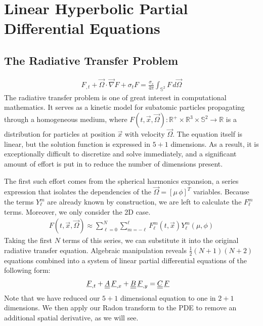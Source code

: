 
\section{Linear Hyperbolic Partial Differential Equations}

\subsection{The Radiative Transfer Problem}
\begin{align*}
	F_{,t} + \vec{\Omega} \cdot \vec{\nabla}F + \sigma_t F = \frac{\sigma_s}{4\pi}\int_{\mathbb{S}^2}F\, d\vec{\Omega}
\end{align*}
The radiative transfer problem is one of great interest in computational mathematics.
It serves as a kinetic model for subatomic particles propagating through a homogeneous medium, where $F(t, \vec{x}, \vec{\Omega}): \mathbb{R}^+ \times \mathbb{R}^3 \times \mathbb{S}^2 \to \mathbb{R}$ is a distribution for particles at position $\vec{x}$ with velocity $\vec{\Omega}$. The equation itself is linear, but the solution function is expressed in $5 + 1$ dimensions.
As a result, it is exceptionally difficult to discretize and solve immediately, and a significant amount of effort is put in to reduce the number of dimensions present.

The first such effort comes from the spherical harmonics expansion, a series expression that isolates the dependencies of the $\vec{\Omega} = [\mu \, \phi]^T$ variables. 
Because the terms $Y_\ell^m$ are already known by construction, we are left to calculate the $F_\ell^m$ terms.
Moreover, we only consider the 2D case.
\begin{align*}
	F(t, \vec{x}, \vec{\Omega}) \approx \sum_{\ell = 0}^N \sum_{m=-\ell}^\ell F_\ell^m(t, \vec{x})Y_\ell^m(\mu, \phi)
\end{align*}
Taking the first $N$ terms of this series, we can substitute it into the original radiative transfer equation.
Algebraic manipulation\cite{BrunnerHolloway:1} reveals $\frac{1}{2}(N+1)(N+2)$ equations combined into a system of linear partial differential equations of the following form:
\begin{align*}
	{\underline{F}}_{,t} + {\underline{\underline{A}}}\,{\underline{F}}_{,x} + {\underline{\underline{B}}}\,{\underline{F}}_{,y} & = {\underline{\underline{C}}}\,{\underline{F}}
\end{align*}
Note that we have reduced our $5+1$ dimensional equation to one in $2+1$ dimensions.
We then apply our Radon transform to the PDE to remove an additional spatial derivative, as we will see.
